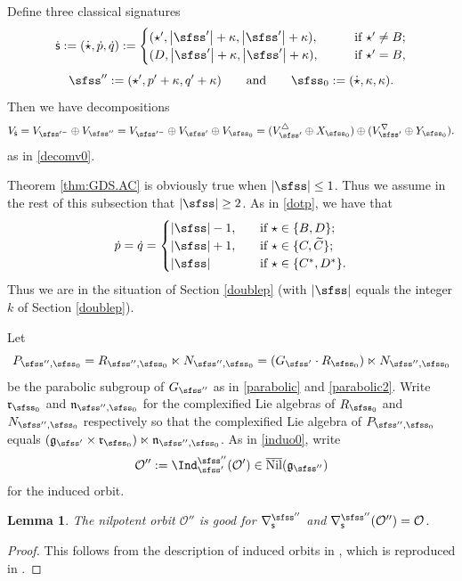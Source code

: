 \documentclass[11pt,a4paper]{amsart}
\def\abs#1{\left|{#1}\right|}
\newcommand{\CO}{{\mathcal {O}}}
\newcommand{\g}{\mathfrak g}
\numberwithin{equation}{section}
\newtheorem{lem}[thm]{Lemma}
\theoremstyle{remark}
\def\Nil{\overline{\mathrm{Nil}}}
\begin{document}



  Define three classical signatures
\[
  \dsfss:=(\dot \star, \dot p, \dot q):=\begin{cases}
    (\star', \abs{\sfss'}+\kappa,  \abs{\sfss'}+\kappa), \qquad  &\textrm{if $\star'\neq B$}; \\
        (D, \abs{\sfss'}+\kappa,  \abs{\sfss'}+\kappa),\qquad  &\textrm{if $\star'=B$},
  \end{cases}
\]
\[
  \sfss'':=(\star', p'+\kappa, q'+\kappa)\qquad\textrm{and}\qquad \sfss_0:=(\dot \star, \kappa, \kappa). %
  \]
Then we have decompositions
\[
  V_{\dsfss}=V_{\sfss'^-}\oplus V_{\sfss''}= V_{\sfss'^-}\oplus V_{\sfss'}\oplus  V_{\sfss_0}= (V_{\sfss'}^\triangle \oplus X_{\sfss_0})\oplus (V_{\sfss'}^\nabla \oplus Y_{\sfss_0}).
\]
as in \eqref{decomv0}.

Theorem \ref{thm:GDS.AC} is obviously true when $\abs{\sfss}\leq 1$. Thus  we  assume in the rest of this subsection that $\abs{\sfss}\geq 2$. As in \eqref{dotp}, we have that
\[
 \dot p=\dot q= \begin{cases}
 \abs{\sfss}-1,\quad   &\textrm{if } \star\in \{B,D\};\\
 \abs{\sfss}+1,  & \textrm{if $\star\in \{C, \widetilde C\}$;}\\
 \abs{\sfss} & \textrm{if $ \star\in\{C^*,D^*\}$.}
\end{cases}
\]
Thus we are in the situation of
Section \ref{doublep} (with $\abs{\sfss}$ equals the integer $k$ of Section \ref{doublep}).

Let
\[
  P_{\sfss'',\sfss_0}=R_{\sfss'',\sfss_0}\ltimes N_{\sfss'',\sfss_0}=(G_{\sfss'}\cdot R_{\sfss_0})\ltimes N_{\sfss'',\sfss_0}
\]
be the parabolic subgroup of $G_{\sfss''}$ as in \eqref{parabolic} and \eqref{parabolic2}. Write $\mathfrak r_{\sfss_0}$ and $\mathfrak n_{\sfss'',\sfss_0}$ for the complexified Lie algebras of $R_{\sfss_0}$ and $N_{\sfss'',\sfss_0}$ respectively so that  the complexified Lie algebra of $P_{\sfss'', \sfss_0}$ equals $(\g_{\sfss'}\times \mathfrak r_{\sfss_0})\ltimes \mathfrak n_{\sfss'',\sfss_0}$.
As in \eqref{induo0}, write
\[
  \CO'':= \Ind_{\sfss'}^{\sfss''}  (\CO')\in \Nil(\g_{\sfss''})
\]
for the induced orbit.


\begin{lem}
The nilpotent orbit $\CO''$ is good for  $\nabla_\mathsf s^{\sfss''}$ and $\nabla_\mathsf s^{\sfss''}(\CO'')=\CO$.
\end{lem}
\begin{proof}
This follows from the description of induced orbits in \cite[Section 7.3]{CM}, which is reproduced in
.
\end{proof}
\end{document}
